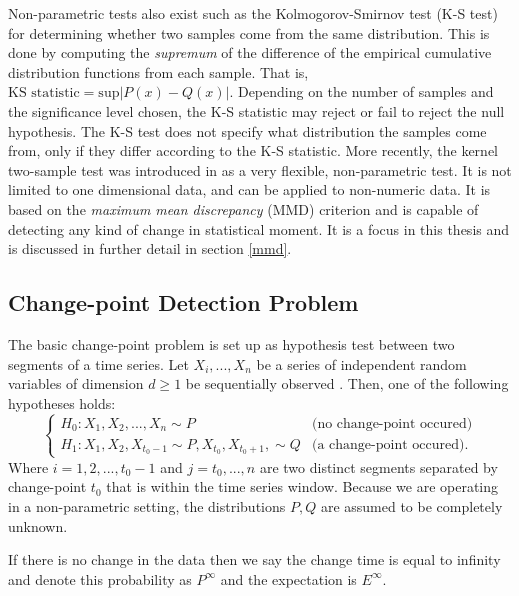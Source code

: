 
Non-parametric tests also exist such as the Kolmogorov-Smirnov test (K-S test) for determining whether two samples come from the same distribution. This is done by computing the \textit{supremum} of the difference of the empirical cumulative distribution functions from each sample. That is, $\text{KS statistic} =\text{sup} |P(x) - Q(x)|$. Depending on the number of samples and the significance level chosen, the K-S statistic may reject or fail to reject the null hypothesis. The K-S test does not specify what distribution the samples come from, only if they differ according to the K-S statistic. More recently, the kernel two-sample test was introduced in \cite{gretton2012kernel} as a very flexible, non-parametric test. It is not limited to one dimensional data, and can be applied to non-numeric data. It is based on the \textit{maximum mean discrepancy} (MMD) criterion and is capable of detecting any kind of change in statistical moment. It is a focus in this thesis and is discussed in further detail in section \ref{mmd}.


\subsection{Change-point Detection Problem}
The basic change-point problem is set up as hypothesis test between two segments of a time series. Let $X_i,...,X_n$ be a series of independent random variables of dimension $d \geq 1$ be sequentially observed . Then, one of the following hypotheses holds:
\begin{equation}
  \begin{cases}
    H_0: X_1, X_2, ...,X_n \sim  P & \text{(no change-point occured)} \\
    H_1: X_1,X_2, X_{t_0-1} \sim P, X_{t_0}, X_{t_0+1},  \sim Q & \text{(a change-point occured)}. 
  \end{cases}
\end{equation}
Where $i=1,2,...,t_0-1$ and $j=t_0,...,n$  are two distinct segments separated by change-point $t_0$ that is within the time series window.  Because we are operating in a non-parametric setting, the distributions $P, Q$ are assumed to be completely unknown. 

If there is no change in the data then we say the change time is equal to infinity and denote this probability as $P^{\infty}$ and the expectation is $E^{\infty}$.

